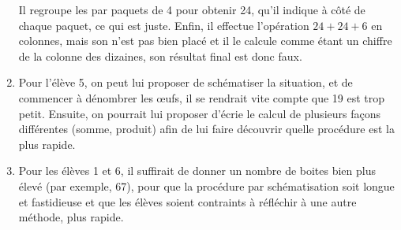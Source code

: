 \begin{enumerate}
   Il regroupe les  \fg{} par paquets de 4 pour obtenir 24, qu'il indique à côté de chaque paquet, ce qui est juste. Enfin, il effectue l'opération $24+24+6$ en colonnes, mais son  \fg{} n'est pas bien placé et il le calcule comme étant un chiffre de la colonne des dizaines, son résultat final est donc faux.
   \item Pour l’élève 5, on peut lui proposer de schématiser la situation, et de commencer à dénombrer les \oe ufs, il se rendrait vite compte que 19 est trop petit. Ensuite, on pourrait lui proposer d'écrie le calcul de plusieurs façons différentes (somme, produit) afin de lui faire découvrir quelle procédure est la plus rapide.
   \item Pour les élèves 1 et 6, il suffirait de donner un nombre de boites bien plus élevé (par exemple, 67), pour que la procédure par schématisation soit longue et fastidieuse et que les élèves soient contraints à réfléchir à une autre méthode, plus rapide.
\end{enumerate}
